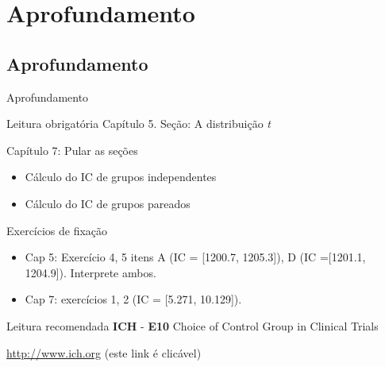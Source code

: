 \documentclass{beamer}
\begin{document}
\section{Aprofundamento}

\subsection{Aprofundamento}

\begin{frame}{Aprofundamento}
  \begin{block}{Leitura obrigatória}
    Capítulo 5. Seção: A distribuição {\em t}

    Capítulo 7: Pular as seções
    \begin{itemize}
    \item Cálculo do IC de grupos independentes
    \item Cálculo do IC de grupos pareados
    \end{itemize}
  \end{block}
  \begin{block}{Exercícios de fixação}
    \begin{itemize}
    \item Cap 5: Exercício 4, 5 itens A (IC = [1200.7, 1205.3]), D (IC =[1201.1, 1204.9]). Interprete ambos.
    \item Cap 7: exercícios 1, 2 (IC = [5.271, 10.129]).
    \end{itemize}
  \end{block}
  \begin{block}{Leitura recomendada}
    {\bf ICH} - {\bf E10} Choice of Control Group in Clinical Trials

    \href{http://www.ich.org/products/guidelines/efficacy/efficacy-single/article/choice-of-control-group-and-related-issues-in-clinical-trials.html}{http://www.ich.org} {\tiny (este link é clicável)}
  \end{block}
\end{frame}
\end{document}
